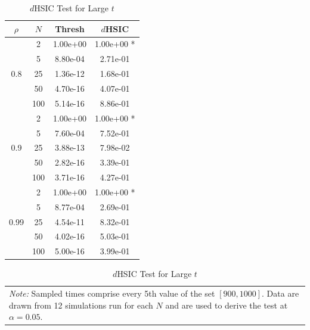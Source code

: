 \begin{table}
    \centering
    \caption{$d$HSIC Test for Large $t$}
    \label{tab:longtime}
    \begin{tabular}{|c|c|c|c|}
\hline
$\rho$ & $N$ & Thresh & $d$HSIC \\
\hline
\hline
 & 2 & 1.00e+00 & 1.00e+00 * \\
 & 5 & 8.80e-04 & 2.71e-01  \\
0.8 & 25 & 1.36e-12 & 1.68e-01  \\
 & 50 & 4.70e-16 & 4.07e-01  \\
 & 100 & 5.14e-16 & 8.86e-01  \\
\hline
 & 2 & 1.00e+00 & 1.00e+00 * \\
 & 5 & 7.60e-04 & 7.52e-01  \\
0.9 & 25 & 3.88e-13 & 7.98e-02  \\
 & 50 & 2.82e-16 & 3.39e-01  \\
 & 100 & 3.71e-16 & 4.27e-01  \\
\hline
 & 2 & 1.00e+00 & 1.00e+00 * \\
 & 5 & 8.77e-04 & 2.69e-01  \\
 0.99 & 25 & 4.54e-11 & 8.32e-01  \\
 & 50 & 4.02e-16 & 5.03e-01  \\
 & 100 & 5.00e-16 & 3.99e-01  \\
\hline
    \end{tabular}

    \begin{tabular}{p{10cm}}
        \textit{Note:} Sampled times comprise every 5th value of the set $[900,1000]$.
        Data are drawn from 12 simulations run for each $N$ and are used to derive the test at $\alpha = 0.05$.
    \end{tabular}
\end{table}







